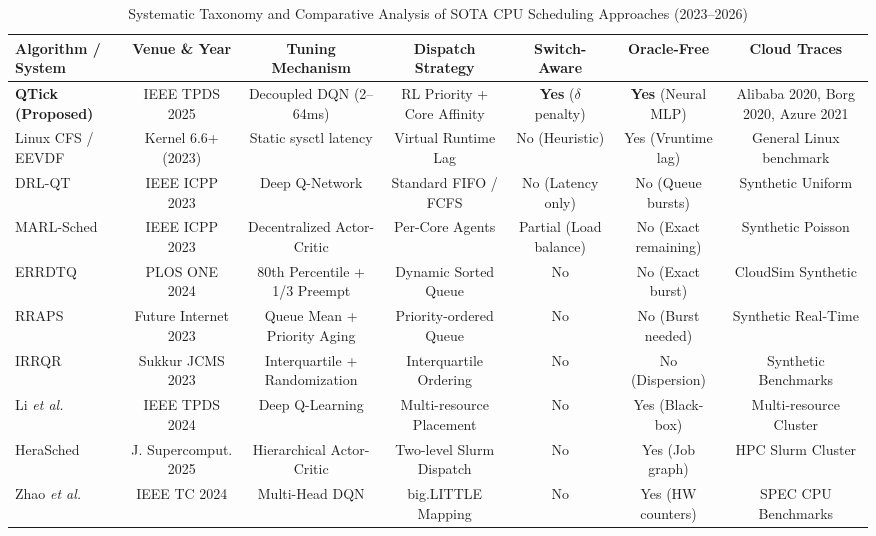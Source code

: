 \documentclass[journal]{IEEEtran}
\begin{document}
\begin{table}[t]
\centering
\caption{Systematic Taxonomy and Comparative Analysis of SOTA CPU Scheduling Approaches (2023--2026)}
\label{tab:taxonomy}
\begin{tabular}{lcccccc}
\toprule
\textbf{Algorithm / System} & \textbf{Venue \& Year} & \textbf{Tuning Mechanism} & \textbf{Dispatch Strategy} & \textbf{Switch-Aware} & \textbf{Oracle-Free} & \textbf{Cloud Traces} \\
\midrule
\textbf{QTick (Proposed)} & IEEE TPDS 2025 & Decoupled DQN (2--64ms) & RL Priority + Core Affinity & \textbf{Yes} ($\delta$ penalty) & \textbf{Yes} (Neural MLP) & Alibaba 2020, Borg 2020, Azure 2021 \\
Linux CFS / EEVDF & Kernel 6.6+ (2023) \cite{zijlstra2023eevdf} & Static sysctl latency & Virtual Runtime Lag & No (Heuristic) & Yes (Vruntime lag) & General Linux benchmark \\
DRL-QT \cite{zhang2023deep} & IEEE ICPP 2023 & Deep Q-Network & Standard FIFO / FCFS & No (Latency only) & No (Queue bursts) & Synthetic Uniform \\
MARL-Sched \cite{chen2023multi} & IEEE ICPP 2023 & Decentralized Actor-Critic & Per-Core Agents & Partial (Load balance) & No (Exact remaining) & Synthetic Poisson \\
ERRDTQ \cite{hasan2024enhanced} & PLOS ONE 2024 & 80th Percentile + 1/3 Preempt & Dynamic Sorted Queue & No & No (Exact burst) & CloudSim Synthetic \\
RRAPS \cite{mehmood2023optimizing} & Future Internet 2023 & Queue Mean + Priority Aging & Priority-ordered Queue & No & No (Burst needed) & Synthetic Real-Time \\
IRRQR \cite{ali2023dynamic} & Sukkur JCMS 2023 & Interquartile + Randomization & Interquartile Ordering & No & No (Dispersion) & Synthetic Benchmarks \\
Li \textit{et al.} \cite{li2024reinforcement} & IEEE TPDS 2024 & Deep Q-Learning & Multi-resource Placement & No & Yes (Black-box) & Multi-resource Cluster \\
HeraSched \cite{herasched2025optimizing} & J. Supercomput. 2025 & Hierarchical Actor-Critic & Two-level Slurm Dispatch & No & Yes (Job graph) & HPC Slurm Cluster \\
Zhao \textit{et al.} \cite{zhao2024deep} & IEEE TC 2024 & Multi-Head DQN & big.LITTLE Mapping & No & Yes (HW counters) & SPEC CPU Benchmarks \\
\bottomrule
\end{tabular}
\end{table}
\end{document}
